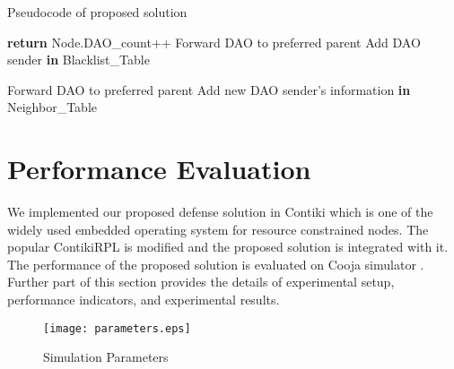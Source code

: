 \documentclass[conference, a4paper]{IEEEtran}
\begin{document}
\begin{algorithm}[!h]
\small
\caption{Pseudocode of proposed solution}
\label{Algo}
\begin{algorithmic}[1]
     
     
\EndProcedure
{}
\State \textbf{return} 
\EndIf
{}
        \State Node.DAO\_count++
        \State Forward DAO to preferred parent
        \Else
        \State Add DAO sender \textbf{in} Blacklist\_{Table}
        \EndIf
    
     \Else
    \State Forward DAO to preferred parent
   \EndIf
 \Else
\State Add new DAO sender's information \textbf{in} Neighbor\_Table
\EndIf      
      \EndFor

\EndProcedure
\end{algorithmic}
\end{algorithm}




\section{Performance Evaluation}\label{Sec:performance evaluation}

We implemented our proposed defense solution in Contiki \cite{dunkels2004contiki} which is one of the widely used embedded operating system for resource constrained nodes.  The popular ContikiRPL is modified and the proposed solution is integrated with it. The performance of the proposed solution is evaluated on Cooja simulator \cite{osterlind2006cross}. Further part of this section provides the details of experimental setup, performance indicators, and experimental results.
 
 
 \begin{figure}
     \centering
     \texttt{[image: parameters.eps]}
     \caption{Simulation Parameters}
     \label{fig:simp}
 \end{figure}
 
\end{document}
